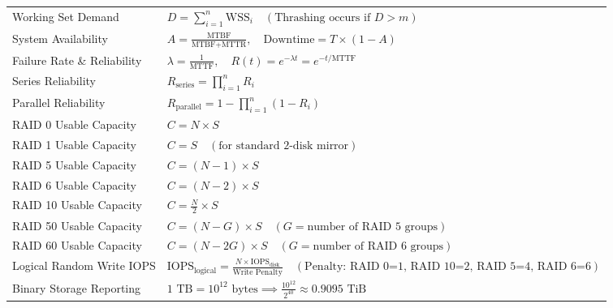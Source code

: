 \begin{table}[htbp]
\begin{tabularx}{\textwidth}{l X}
Working Set Demand & $D = \sum_{i=1}^{n} \text{WSS}_i \quad (\text{Thrashing occurs if } D > m)$ \\
System Availability & $A = \frac{\text{MTBF}}{\text{MTBF} + \text{MTTR}}, \quad \text{Downtime} = T \times (1 - A)$ \\
Failure Rate \& Reliability & $\lambda = \frac{1}{\text{MTTF}}, \quad R(t) = e^{-\lambda t} = e^{-t / \text{MTTF}}$ \\
Series Reliability & $R_{\text{series}} = \prod_{i=1}^{n} R_i$ \\
Parallel Reliability & $R_{\text{parallel}} = 1 - \prod_{i=1}^{n} (1 - R_i)$ \\
RAID 0 Usable Capacity & $C = N \times S$ \\
RAID 1 Usable Capacity & $C = S \quad (\text{for standard 2-disk mirror})$ \\
RAID 5 Usable Capacity & $C = (N - 1) \times S$ \\
RAID 6 Usable Capacity & $C = (N - 2) \times S$ \\
RAID 10 Usable Capacity & $C = \frac{N}{2} \times S$ \\
RAID 50 Usable Capacity & $C = (N - G) \times S \quad (G = \text{number of RAID 5 groups})$ \\
RAID 60 Usable Capacity & $C = (N - 2G) \times S \quad (G = \text{number of RAID 6 groups})$ \\
Logical Random Write IOPS & $\text{IOPS}_{\text{logical}} = \frac{N \times \text{IOPS}_{\text{disk}}}{\text{Write Penalty}} \quad (\text{Penalty: RAID 0=1, RAID 10=2, RAID 5=4, RAID 6=6})$ \\
Binary Storage Reporting & $1\text{ TB} = 10^{12}\text{ bytes} \implies \frac{10^{12}}{2^{40}} \approx 0.9095\text{ TiB}$ \\
\bottomrule
\end{tabularx}
\end{table}

